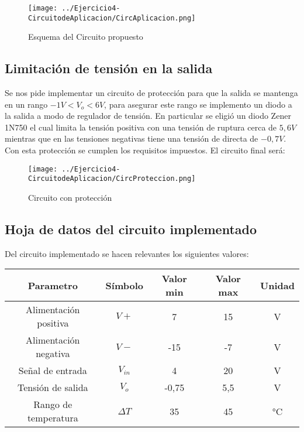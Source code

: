 \begin{figure}[H]
    \centering
    \texttt{[image: ../Ejercicio4-CircuitodeAplicacion/CircAplicacion.png]}
    \caption{Esquema del Circuito propuesto}
\end{figure}


\subsection{Limitación de tensión en la salida}

Se nos pide implementar un circuito de protección para que la salida se mantenga en un rango $-1V < V_o < 6V$, para asegurar este rango se implemento un diodo a la salida a modo de regulador de tensión. En particular se eligió un diodo Zener 1N750 el cual limita la tensión positiva con una tensión de ruptura cerca de $5,6V$ mientras que en las tensiones negativas tiene una tensión de directa de $-0,7V$. Con esta protección se cumplen los requisitos impuestos. El circuito final será:

\begin{figure}[H]
    \centering
    \texttt{[image: ../Ejercicio4-CircuitodeAplicacion/CircProteccion.png]}
    \caption{Circuito con protección}
\end{figure}


\subsection{Hoja de datos del circuito implementado}

Del circuito implementado se hacen relevantes los siguientes valores:

\begin{table}[H]
\centering
\begin{tabular}{|c|c|c|c|c|}
\hline
\textbf{Parametro}    & \textbf{Símbolo}        & \textbf{Valor min} & \textbf{Valor max} & \textbf{Unidad} \\ \hline
Alimentación positiva & $V+$                      & 7                  & 15                 & V               \\ \hline
Alimentación negativa & $V-$                      & -15                & -7                 & V               \\ \hline
Señal de entrada      & $V_{in}$               & 4                  & 20                 & V               \\ \hline
Tensión de salida     & $V_{o}$                & -0,75              & 5,5                & V               \\ \hline
Rango de temperatura  & $\Delta T$ & 35                 & 45                 & °C              \\ \hline
\end{tabular}
\end{table}





